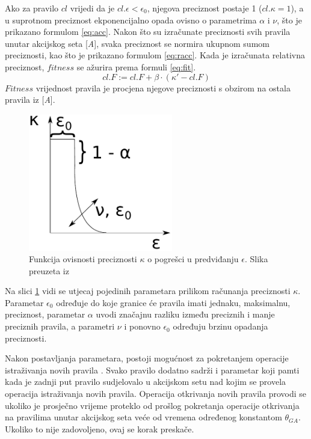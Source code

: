 \documentclass[times, utf8, zavrsni]{fer}
\begin{document}
Ako za pravilo $cl$ vrijedi da je $cl.\epsilon < \epsilon_{0}$, njegova preciznost postaje 1 ($cl.\kappa = 1$), a u suprotnom preciznost ekponencijalno opada ovisno o parametrima $\alpha$ i $\nu$, što je prikazano formulom \eqref{eq:acc}.
Nakon što su izračunate preciznosti svih pravila unutar akcijskog seta [\emph{A}], svaka preciznost se normira ukupnom sumom preciznosti, kao što je prikazano formulom \eqref{eq:racc}.
Kada je izračunata relativna preciznost, $fitness$ se ažurira prema formuli \eqref{eq:fit}.
\begin{equation}
    \label{eq:fit}
    cl.F := cl.F + \beta \cdot (\kappa' - cl.F)
\end{equation}
$Fitness$ vrijednost pravila je procjena njegove preciznosti s obzirom na ostala pravila iz [\emph{A}].
\begin{figure}[h]
    \centering
    \includegraphics[height=6cm]{img/fit.pdf}
    \caption{Funkcija ovisnosti preciznosti $\kappa$ o pogrešci u predviđanju $\epsilon$. Slika preuzeta iz \citep{5}}
    \label{img:fit}
\end{figure}
Na slici \ref{img:fit} vidi se utjecaj pojedinih parametara prilikom računanja preciznosti $\kappa$.
Parametar $\epsilon_{0}$ određuje do koje granice će pravila imati jednaku, maksimalnu, preciznost, parametar $\alpha$ uvodi značajnu razliku između preciznih i manje preciznih pravila, a parametri $\nu$ i ponovno $\epsilon_{0}$ određuju brzinu opadanja preciznosti.

Nakon postavljanja parametara, postoji mogućnost za pokretanjem operacije istraživanja novih pravila .
Svako pravilo dodatno sadrži i parametar koji pamti kada je zadnji put pravilo sudjelovalo u akcijskom setu nad kojim se provela operacija istraživanja novih pravila.
Operacija otkrivanja novih pravila provodi se ukoliko je prosječno vrijeme proteklo od prošlog pokretanja operacije otkrivanja na pravilima unutar akcijskog seta veće od vremena određenog konstantom $\theta_{GA}$.
Ukoliko to nije zadovoljeno, ovaj se korak preskače.
\end{document}
